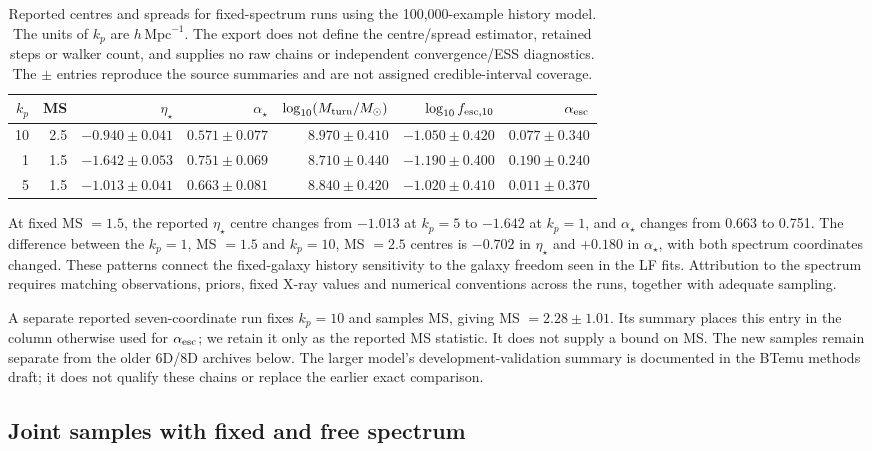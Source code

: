 \begin{table}[t]\centering\small
\caption{Reported centres and spreads for fixed-spectrum runs using the 100,000-example history model. The units of $k_p$ are $h\,\mathrm{Mpc}^{-1}$. The export does not define the centre/spread estimator, retained steps or walker count, and supplies no raw chains or independent convergence/ESS diagnostics. The $\pm$ entries reproduce the source summaries and are not assigned credible-interval coverage.}\label{tab:fixed-100k}
\begin{tabular*}{\textwidth}{@{\extracolsep{\fill}}rrrrrrr}\toprule
$k_p$ & MS & $\eta_\star$ & $\alpha_\star$ & $\log_{10}(M_{\rm turn}/M_\odot)$ & $\log_{10}f_{{\rm esc},10}$ & $\alpha_{\rm esc}$\\\midrule
10 & 2.5 & $-0.940\pm0.041$ & $0.571\pm0.077$ & $8.970\pm0.410$ & $-1.050\pm0.420$ & $0.077\pm0.340$\\
1 & 1.5 & $-1.642\pm0.053$ & $0.751\pm0.069$ & $8.710\pm0.440$ & $-1.190\pm0.400$ & $0.190\pm0.240$\\
5 & 1.5 & $-1.013\pm0.041$ & $0.663\pm0.081$ & $8.840\pm0.420$ & $-1.020\pm0.410$ & $0.011\pm0.370$\\
\bottomrule\end{tabular*}\end{table}

At fixed MS $=1.5$, the reported $\eta_\star$ centre changes from $-1.013$ at $k_p=5$ to $-1.642$ at $k_p=1$, and $\alpha_\star$ changes from 0.663 to 0.751. The difference between the $k_p=1$, MS $=1.5$ and $k_p=10$, MS $=2.5$ centres is $-0.702$ in $\eta_\star$ and $+0.180$ in $\alpha_\star$, with both spectrum coordinates changed. These patterns connect the fixed-galaxy history sensitivity to the galaxy freedom seen in the LF fits. Attribution to the spectrum requires matching observations, priors, fixed X-ray values and numerical conventions across the runs, together with adequate sampling.

A separate reported seven-coordinate run fixes $k_p=10$ and samples MS, giving MS $=2.28\pm1.01$. Its summary places this entry in the column otherwise used for $\alpha_{\rm esc}$; we retain it only as the reported MS statistic. It does not supply a bound on MS. The new samples remain separate from the older 6D/8D archives below. The larger model's development-validation summary is documented in the BTemu methods draft; it does not qualify these chains or replace the earlier exact comparison.

\subsection{Joint samples with fixed and free spectrum}\label{joint-samples-fixed-free}

